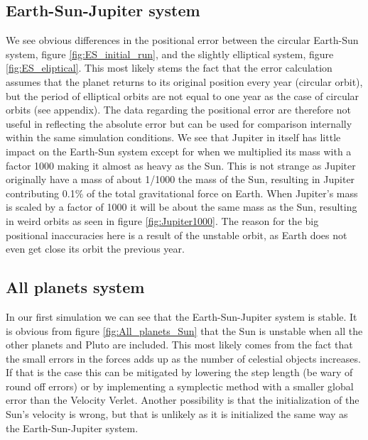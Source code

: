 \documentclass[american,a4paper,12pt]{article}
\begin{document}
\subsection{Earth-Sun-Jupiter system}
We see obvious differences in the positional error between the circular Earth-Sun system, figure \ref{fig:ES_initial_run}, and the slightly elliptical system, figure \ref{fig:ES_eliptical}. This most likely stems the fact that the error calculation assumes that the planet returns to its original position every year (circular orbit), but the period of elliptical orbits are not equal to one year as the case of circular orbits (see appendix). The data regarding the positional error are therefore not useful in reflecting the absolute error but can be used for comparison internally within the same simulation conditions. We see that Jupiter in itself has little impact on the Earth-Sun system except for when we multiplied its mass with a factor 1000 making it almost as heavy as the Sun. This is not strange as Jupiter originally have a mass of about 1/1000 the mass of the Sun, resulting in Jupiter contributing 0.1$\%$ of the total gravitational force on Earth. When Jupiter's mass is scaled by a factor of 1000 it will be about the same mass as the Sun, resulting in weird orbits as seen in figure \ref{fig:Jupiter1000}. The reason for the big positional inaccuracies here is a result of the unstable orbit, as Earth does not even get close its orbit the previous year.
\subsection{All planets system}
In our first simulation we can see that the Earth-Sun-Jupiter system is stable. It is obvious from figure \ref{fig:All_planets_Sun} that the Sun is unstable when all the other planets and Pluto are included. This most likely comes from the fact that the small errors in the forces adds up as the number of celestial objects increases. If that is the case this can be mitigated by lowering the step length (be wary of round off errors) or by implementing a symplectic method with a smaller global error than the Velocity Verlet. Another possibility is that the initialization of the Sun's velocity is wrong, but that is unlikely as it is initialized the same way as the Earth-Sun-Jupiter system.

\newpage
\end{document}
